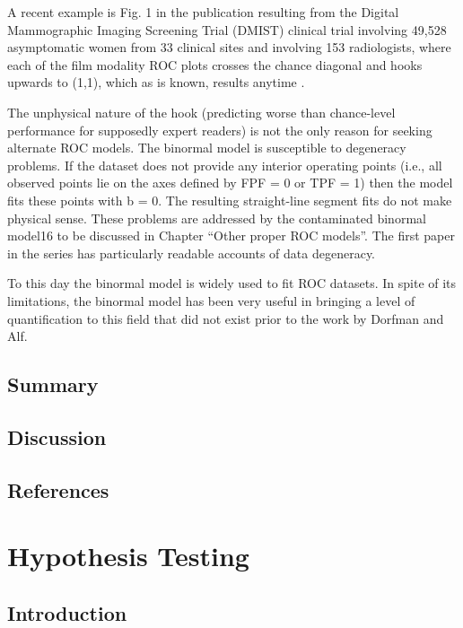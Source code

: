 \documentclass[
]{book}
\begin{document}
A recent example is Fig. 1 in the publication resulting from the Digital Mammographic Imaging Screening Trial (DMIST) clinical trial \citep{RN1784} involving 49,528 asymptomatic women from 33 clinical sites and involving 153 radiologists, where each of the film modality ROC plots crosses the chance diagonal and hooks upwards to (1,1), which as is known, results anytime .

The unphysical nature of the hook (predicting worse than chance-level performance for supposedly expert readers) is not the only reason for seeking alternate ROC models. The binormal model is susceptible to degeneracy problems. If the dataset does not provide any interior operating points (i.e., all observed points lie on the axes defined by FPF = 0 or TPF = 1) then the model fits these points with b = 0. The resulting straight-line segment fits do not make physical sense. These problems are addressed by the contaminated binormal model16 to be discussed in Chapter ``Other proper ROC models''. The first paper in the series has particularly readable accounts of data degeneracy.

To this day the binormal model is widely used to fit ROC datasets. In spite of its limitations, the binormal model has been very useful in bringing a level of quantification to this field that did not exist prior to the work \citep{RN212} by Dorfman and Alf.

\hypertarget{BinMod-Summary}{%
\section{Summary}\label{BinMod-Summary}}

\hypertarget{BinMod-Discussion}{%
\section{Discussion}\label{BinMod-Discussion}}

\hypertarget{BinMod-references}{%
\section{References}\label{BinMod-references}}

\hypertarget{HypothesisTesting}{%
\chapter{Hypothesis Testing}\label{HypothesisTesting}}

\hypertarget{HypothesisTesting-introduction}{%
\section{Introduction}\label{HypothesisTesting-introduction}}
\end{document}
